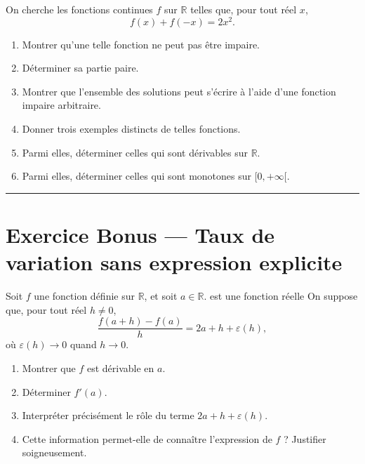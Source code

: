 \documentclass[11pt,a4paper]{article}
\newcommand{\R}{\mathbb{R}}
\begin{document}
On cherche les fonctions continues \(f\) sur \(\R\) telles que, pour tout réel \(x\),
\[
f(x)+f(-x)=2x^2.
\]

\begin{enumerate}[label=\arabic*.]
    \item Montrer qu’une telle fonction ne peut pas être impaire.
    \item Déterminer sa partie paire.
    \item Montrer que l’ensemble des solutions peut s’écrire à l’aide d’une fonction impaire arbitraire.
    \item Donner trois exemples distincts de telles fonctions.
    \item Parmi elles, déterminer celles qui sont dérivables sur \(\R\).
    \item Parmi elles, déterminer celles qui sont monotones sur \([0,+\infty[\).
\end{enumerate}

\vspace{1em}
\hrule
\vspace{1em}



\section*{Exercice Bonus --- Taux de variation sans expression explicite}

Soit \(f\) une fonction définie sur \(\R\), et soit \(a\in\R\).
\varepsilon\) est une fonction réelle
On suppose que, pour tout réel \(h\neq 0\),
\[
\frac{f(a+h)-f(a)}{h}=2a+h+\varepsilon(h),
\]
où \(\varepsilon(h)\to 0\) quand \(h\to 0\).

\begin{enumerate}[label=\arabic*.]
    \item Montrer que \(f\) est dérivable en \(a\).
    \item Déterminer \(f'(a)\).
    \item Interpréter précisément le rôle du terme \(2a+h+\varepsilon(h)\).
    \item Cette information permet-elle de connaître l’expression de \(f\) ? Justifier soigneusement.
\end{enumerate}
\end{document}
